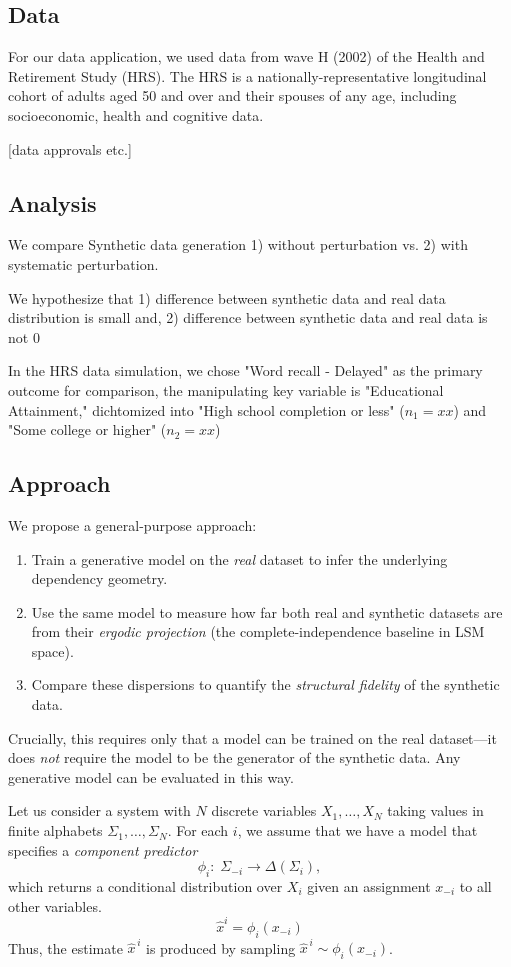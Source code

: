 \documentclass[10pt,journal]{IEEEtran}
\begin{document}
\subsection*{Data}
For our data application, we used data from wave H (2002) of the Health and Retirement Study (HRS). \cite{sonnega_cohort_2014} The HRS is a nationally-representative longitudinal cohort of adults aged 50 and over and their spouses of any age, including socioeconomic, health and cognitive data. 

[data approvals etc.]

\subsection*{Analysis}
We compare Synthetic data generation 1) without perturbation vs. 2) with systematic perturbation.

We hypothesize that 1) difference between synthetic data and real data distribution is small and, 2) difference between synthetic data and real data is not 0

In the HRS data simulation, we chose "Word recall - Delayed" as the primary outcome for comparison, the manipulating key variable is "Educational Attainment," dichtomized into "High school completion or less" ($n_1=xx$) and "Some college or higher" ($n_2=xx$) 
\\

\subsection*{Approach}
We propose a general-purpose approach:
\begin{enumerate}
    \item Train a generative model on the \emph{real} dataset to infer the underlying dependency geometry.
    \item Use the same model to measure how far both real and synthetic datasets are from their \emph{ergodic projection} (the complete-independence baseline in LSM space).
    \item Compare these dispersions to quantify the \emph{structural fidelity} of the synthetic data.
\end{enumerate}
Crucially, this requires only that a model can be trained on the real dataset---it does \emph{not} require the model to be the generator of the synthetic data. Any generative model can be evaluated in this way.

Let us consider a system with $N$ discrete variables $X_1,\ldots,X_N$ taking values in finite alphabets $\Sigma_1,\ldots,\Sigma_N$. For each $i$, we assume that we have a model that specifies a \emph{component predictor}
\[
\phi_i:\;\Sigma_{-i}\to\Delta(\Sigma_i),
\]
which returns a conditional distribution over $X_i$ given an assignment $x_{-i}$ to all other variables. 
\[
\hat{x}^i = \phi_i(x_{-i})
\]
Thus, the estimate $\hat x^{\,i}$ is produced by sampling $\hat x^{\,i}\sim \phi_i(x_{-i})$.
\end{document}
